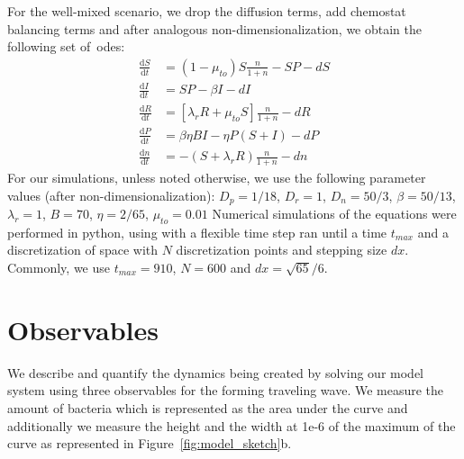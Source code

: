 For the well-mixed scenario, we drop the diffusion terms, add chemostat balancing terms and after analogous non-dimensionalization, we obtain the following set of~\gls{ode}s:
\begin{align}
    \frac{\text{d}S}{\text{d}t} &= \left( 1 - \mu_{to} \right) S \frac{n}{1+n}  - SP - d S\\
    \frac{\text{d}I}{\text{d}t} &= SP - \beta I - d I\\
    \frac{\text{d}R}{\text{d}t} &= \left[\lambda_r R + \mu_{to} S \right] \frac{n}{1+n} - d R\\
    \frac{\text{d}P}{\text{d}t} &= \beta \eta BI - \eta P(S+I) -d P\\
    \frac{\text{d}n}{\text{d}t} &= - \left( S + \lambda_r R \right) \frac{n}{1+n} - d n
\end{align}
For our simulations, unless noted otherwise, we use the following parameter values (after non-dimensionalization):
$D_p = 1/18$, $D_r = 1$, $D_n = 50/3$, $\beta = 50/13$, $\lambda_r = 1$, $B = 70$, $\eta = 2/65$, $\mu_{to} = 0.01$
Numerical simulations of the equations were performed in python, using  with a flexible time step ran until a time $t_{max}$ and a discretization of space with $N$ discretization points and stepping size $dx$.
Commonly, we use $t_{max} = 910$, $N = 600$ and $dx = \sqrt{65}/6$.

\section{Observables}

We describe and quantify the dynamics being created by solving our model system using three observables for the forming traveling wave. We measure the amount of bacteria which is represented as the area under the curve and additionally we measure the height and the width at 1e-6 of the maximum of the curve as represented in Figure~\ref{fig:model_sketch}b.
